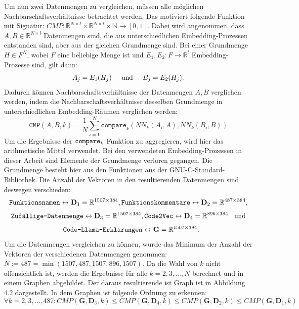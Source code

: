 \documentclass[12pt,letterpaper,ngerman]{article}
\begin{document}
Um nun zwei Datenmengen zu vergleichen, müssen alle möglichen 
Nachbarschaftsverhältnisse betrachtet werden. Das motiviert folgende
Funktion mit Signatur:
$CMP: \mathbb{R}^{N\times l} \times  \mathbb{R}^{N\times l} \times \mathbb{N} \to [0,1]$.
Dabei wird angenommen, dass $A,B \in \mathbb{R}^{N\times l}$ Datenmengen
sind, die aus unterschiedlichen Embedding-Prozessen entstanden sind,
aber aus der gleichen Grundmenge sind. Bei einer Grundmenge $H \in F^N$,
wobei $F$ eine beliebige Menge ist und   
$E_1,E_2: F \to \mathbb{R}^{l}$ Embedding-Prozesse sind, gilt dann:
\[
  A_j = E_1(H_j)  \hspace{0.5cm }\text{und} 
  \hspace{0.5cm } B_j = E_2(H_j).
\]
Dadurch können Nachbarschaftsverhältnisse der Datenmengen $A,B$ 
verglichen werden, indem die Nachbarschaftsverhältnisse desselben 
Grundmenge in unterschiedlichen Embedding-Räumen verglichen werden:
\[
  \texttt{CMP}(A,B,k) = \frac{1}{N}\sum_{i = 1}^{N}
    \texttt{compare}_k(NN_k(A_i,A),NN_k(B_i, B))
\]
Um die Ergebnisse der $\verb|compare|_k$ Funktion zu aggregieren,
wird hier das arithmetische Mittel verwendet.
Bei den verwendeten Embedding-Prozessen in dieser Arbeit sind
Elemente der Grundmenge verloren gegangen. Die Grundmenge besteht 
hier aus den Funktionen aus der GNU-C-Standard-Bibliothek.
Die Anzahl der Vektoren in den resultierenden Datenmengen sind
deswegen verschieden: 
\[
  \verb|Funktionsnamen| \leftrightarrow \mathbf{D}_1=\mathbb{R}^{1507\times 384},
  \verb|Funktionskommentare| \leftrightarrow \mathbf{D}_2=\mathbb{R}^{487\times 384},
\]
\[
  \verb|Zufällige-Datenmenge|\leftrightarrow \mathbf{D}_3=\mathbb{R}^{1507\times 384},
  \verb|Code2Vec| \leftrightarrow \mathbf{D}_4=\mathbb{R}^{896\times 384} \hspace{0.3cm}\text{und}
\]
\[
  \hspace{0.3cm} \verb|Code-Llama-Erklärungen| \leftrightarrow \mathbf{G}=\mathbb{R}^{1507\times 384}.
\]
Um die Datenmengen vergleichen zu können, wurde das Minimum der 
Anzahl der Vektoren der verschiedenen Datenmengen genommen:
$N:= 487 = \min(1507, 487, 1507, 896, 1507) $. Da die Wahl von $k$ nicht 
offensichtlich ist, werden die Ergebnisse für alle 
$k = 2, 3, \dots, N$ berechnet und in einem 
Graphen abgebildet. Der daraus resultierende ist Graph
ist in Abbildung 4.2 dargestellt. In dem Graphen ist folgende 
Ordnung zu erkennen: 
\[ 
  \forall k=2,3,\dots,487: CMP(\mathbf{G}, \mathbf{D}_3,k) \leq 
    CMP(\mathbf{G}, \mathbf{D}_4, k) \leq 
    CMP(\mathbf{G}, \mathbf{D}_2, k) \leq 
    CMP(\mathbf{G}, \mathbf{D}_1, k)
\]
\end{document}
